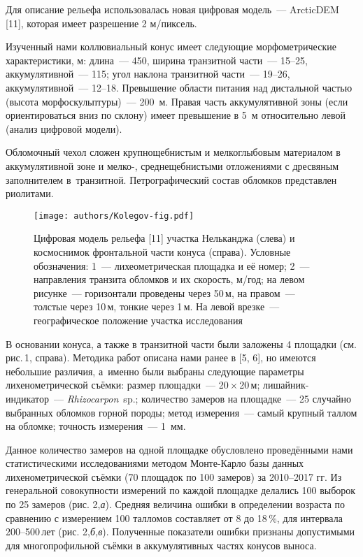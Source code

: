 Для описание рельефа использовалась новая цифровая модель~--- ArcticDEM [11], которая имеет разрешение 2 м/пиксель.

Изученный нами коллювиальный конус имеет следующие морфометрические характеристики, м: длина~---  450, ширина транзитной части~---  15--25, аккумулятивной~--- 115; угол наклона транзитной части~--- 19--26\dg, аккумулятивной~--- 12--18\dg. Превышение области питания над дистальной частью (высота морфоскульптуры)~--- 200~м. Правая часть аккумулятивной зоны (если ориентироваться вниз по склону) имеет превышение в 5~м относительно левой (анализ цифровой модели).

Обломочный чехол сложен крупнощебнистым и мелкоглыбовым материалом в аккумулятивной зоне и мелко-, среднещебнистыми отложениями с дресвяным заполнителем в~транзитной. Петрографический состав обломков представлен риолитами.

\begin{figure}[H]
  \centering
  \texttt{[image: authors/Kolegov-fig.pdf]}
  \caption{Цифровая модель рельефа [11] участка Нельканджа (слева) и космоснимок фронтальной части конуса (справа). Условные обозначения: 1~--- лихеометрическая площадка и её номер; 2~--- направления транзита обломков и их скорость, м/год; на левом рисунке~--- горизонтали проведены через 50\,м, на правом~--- толстые через 10\,м, тонкие через 1\,м. На левой врезке~--- географическое положение участка исследования}
  \label{fig:kolegov-fig}
\end{figure}

В основании конуса, а также в транзитной части были заложены 4 площадки (см. рис.\,1, справа). Методика работ описана нами ранее в [5, 6], но имеются небольшие различия, а~именно были выбраны следующие параметры лихенометрической съёмки:  размер площадки~--- 20\,$\times$\,20\,м; лишайник-индикатор~--- \textit{Rhizocarpon}~sp.; количество замеров на площадке~--- 25 случайно выбранных обломков горной породы; метод измерения~--- самый крупный таллом на обломке; точность измерения~--- 1~мм.

Данное количество замеров на одной площадке обусловлено проведёнными нами статистическими исследованиями методом Монте-Карло базы данных лихенометрической съёмки (70 площадок по 100 замеров) за 2010--2017 гг. Из генеральной совокупности измерений по каждой площадке делались 100 выборок по 25 замеров (рис. 2,\textit{а}). Средняя величина ошибки в определении возраста по сравнению с измерением 100 талломов составляет от 8 до 18\,\%, для интервала 200--500\,лет (рис. 2,\textit{б,в}).  Полученные показатели ошибки признаны допустимыми для многопрофильной съёмки в аккумулятивных частях конусов выноса.



